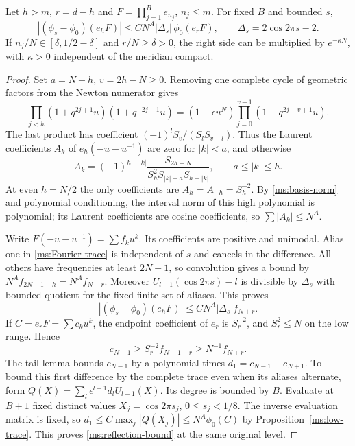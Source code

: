 \begin{proposition}\label{ms:reflected}
Let $h>m$, $r=d-h$ and $F=\prod_{j=1}^B e_{n_j}$, $n_j\le m$.
For fixed $B$ and bounded $s$,
\begin{equation}\label{ms:reflection-bound}
 |(\phi_s-\phi_0)(e_hF)|
 \le C N^A|\Delta_s|\,\phi_0(e_rF),
 \qquad \Delta_s=2\cos2\pi s-2.
\end{equation}
If $n_j/N\in[\delta,1/2-\delta]$ and $r/N\ge\delta>0$,
the right side can be multiplied by $e^{-\kappa N}$, with
$\kappa>0$ independent of the meridian compact.
\end{proposition}
\begin{proof}
Set $a=N-h$, $v=2h-N\ge0$. Removing one complete cycle of
geometric factors from the Newton numerator gives
\[
 \prod_{j<h}(1+q^{2j+1}u)(1+q^{-2j-1}u)
 =(1-\epsilon u^N)\prod_{j=0}^{v-1}(1-q^{2j-v+1}u).
\]
The last product has coefficient $(-1)^l S_v/(S_lS_{v-l})$.
Thus the Laurent coefficients $A_k$ of $e_h(-u-u^{-1})$ are
zero for $|k|<a$, and otherwise
\begin{equation}\label{ms:high-coefficients}
 A_k=(-1)^{h-|k|}
       \frac{S_{2h-N}}{S_h^2S_{|k|-a}S_{h-|k|}},
       \qquad a\le|k|\le h.
\end{equation}
At even $h=N/2$ the only coefficients are
$A_h=A_{-h}=S_h^{-2}$. By \eqref{ms:basis-norm} and polynomial
conditioning, the interval norm of this high polynomial is
polynomial; its Laurent coefficients are cosine coefficients, so
$\sum|A_k|\le N^A$.

Write $F(-u-u^{-1})=\sum f_k u^k$. Its coefficients are positive
and unimodal. Alias one in \eqref{ms:Fourier-trace} is independent
of $s$ and cancels in the difference. All others have frequencies
at least $2N-1$, so convolution gives a bound by
$N^A f_{2N-1-h}=N^A f_{N+r}$. Moreover
$U_{l-1}(\cos2\pi s)-l$ is divisible by $\Delta_s$ with bounded
quotient for the fixed finite set of aliases. This proves
\begin{equation}\label{ms:high-tail}
 |(\phi_s-\phi_0)(e_hF)|\le C N^A|\Delta_s|f_{N+r}.
\end{equation}
If $C=e_rF=\sum c_k u^k$, the endpoint coefficient of $e_r$ is
$S_r^{-2}$, and $S_r^2\le N$ on the low range. Hence
\[
 c_{N-1}\ge S_r^{-2}f_{N-1-r}\ge N^{-1}f_{N+r}.
\]
The tail lemma bounds $c_{N-1}$ by a polynomial times
$d_1=c_{N-1}-c_{N+1}$. To bound this first difference by the
complete trace even when its aliases alternate, form
$Q(X)=\sum_l\epsilon^{l+1}d_lU_{l-1}(X)$.
Its degree is bounded by $B$. Evaluate at $B+1$ fixed distinct
values $X_j=\cos2\pi s_j$, $0\le s_j<1/8$. The inverse
evaluation matrix is fixed, so
$d_1\le C\max_j|Q(X_j)|\le N^A\phi_0(C)$ by
Proposition~\ref{ms:low-trace}. This proves
\eqref{ms:reflection-bound} at the same original level.


\end{proof}
